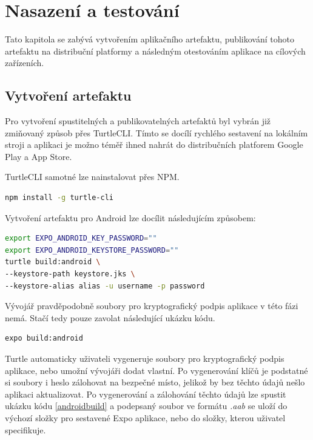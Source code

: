 \chapter{Nasazení a testování}

Tato kapitola se zabývá vytvořením aplikačního artefaktu, publikování tohoto artefaktu na distribuční platformy a následným otestováním aplikace na cílových zařízeních.

\section{Vytvoření artefaktu}

Pro vytvoření spustitelných a publikovatelných artefaktů byl vybrán již zmiňovaný způsob přes TurtleCLI. Tímto se docílí rychlého sestavení na lokálním stroji a aplikaci je možno téměř ihned nahrát do distribučních platforem Google Play a App Store.

TurtleCLI samotné lze nainstalovat přes NPM.

\begin{lstlisting}[language=Bash, caption=Instalace TurtleCLI]
npm install -g turtle-cli
\end{lstlisting}

Vytvoření artefaktu pro Android lze docílit následujícím způsobem:

\begin{lstlisting}[language=Bash, caption=Sestavení na Android,label={androidbuild}]
export EXPO_ANDROID_KEY_PASSWORD=""
export EXPO_ANDROID_KEYSTORE_PASSWORD=""
turtle build:android \
--keystore-path keystore.jks \
--keystore-alias alias -u username -p password
\end{lstlisting}

Vývojář pravděpodobně soubory pro kryptografický podpis aplikace v této fázi nemá. Stačí tedy pouze zavolat následující ukázku kódu.

\begin{lstlisting}[language=Bash, caption=Vygenerování klíčů pro Android]
expo build:android
\end{lstlisting}

Turtle automaticky uživateli vygeneruje soubory pro kryptografický podpis aplikace, nebo umožní vývojáři dodat vlastní. Po vygenerování klíčů je podstatné si soubory i heslo zálohovat na bezpečné místo, jelikož by bez těchto údajů nešlo aplikaci aktualizovat. Po vygenerování a zálohování těchto údajů lze spustit ukázku kódu \ref{androidbuild} a podepsaný soubor ve formátu \emph{.aab} se uloží do výchozí složky pro sestavené Expo aplikace, nebo do složky, kterou uživatel specifikuje.

